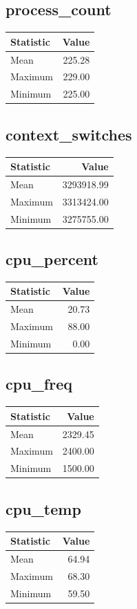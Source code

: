\documentclass[11pt]{article}
\begin{document}
\subsection{process_count}
\begin{tabular}{lr}
\toprule
Statistic & Value \\
\midrule
Mean & 225.28 \\
Maximum & 229.00 \\
Minimum & 225.00 \\
\bottomrule
\end{tabular}


\subsection{context_switches}
\begin{tabular}{lr}
\toprule
Statistic & Value \\
\midrule
Mean & 3293918.99 \\
Maximum & 3313424.00 \\
Minimum & 3275755.00 \\
\bottomrule
\end{tabular}


\subsection{cpu_percent}
\begin{tabular}{lr}
\toprule
Statistic & Value \\
\midrule
Mean & 20.73 \\
Maximum & 88.00 \\
Minimum & 0.00 \\
\bottomrule
\end{tabular}


\subsection{cpu_freq}
\begin{tabular}{lr}
\toprule
Statistic & Value \\
\midrule
Mean & 2329.45 \\
Maximum & 2400.00 \\
Minimum & 1500.00 \\
\bottomrule
\end{tabular}


\subsection{cpu_temp}
\begin{tabular}{lr}
\toprule
Statistic & Value \\
\midrule
Mean & 64.94 \\
Maximum & 68.30 \\
Minimum & 59.50 \\
\bottomrule
\end{tabular}
\end{document}
